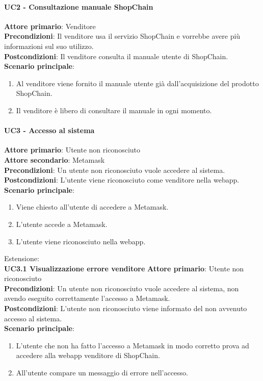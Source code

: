\documentclass[a4paper, 12pt]{article}
\begin{document}
\paragraph{UC2 - Consultazione manuale ShopChain}
\textbf{Attore primario}: Venditore\\
\textbf{Precondizioni}: Il venditore usa il servizio ShopChain e vorrebbe avere più informazioni sul suo utilizzo.\\
\textbf{Postcondizioni}: Il venditore consulta il manuale utente di ShopChain.\\
\textbf{Scenario principale}:\\
\begin{enumerate}
\item Al venditore viene fornito il manuale utente già dall'acquisizione del prodotto ShopChain.
\item Il venditore è libero di consultare il manuale in ogni momento.
\end{enumerate}


\paragraph{UC3 - Accesso al sistema}
\textbf{Attore primario}: Utente non riconosciuto\\
\textbf{Attore secondario}: Metamask\\
\textbf{Precondizioni}:  Un utente non riconosciuto vuole accedere al sistema.\\
\textbf{Postcondizioni}: L'utente viene riconosciuto come venditore nella webapp.\\
\textbf{Scenario principale}:
\begin{enumerate}
\item Viene chiesto all'utente di accedere a Metamask.
\item L'utente accede a Metamask.
\item L'utente viene riconosciuto nella webapp.
\end{enumerate}
Estensione:\\
\textbf{UC3.1 Visualizzazione errore venditore}
\textbf{Attore primario}: Utente non riconosciuto\\
\textbf{Precondizioni}: Un utente non riconosciuto vuole accedere al sistema, non avendo eseguito correttamente l'accesso a Metamask.\\
\textbf{Postcondizioni}: L'utente non riconosciuto viene informato del non avvenuto accesso al sistema.\\
\textbf{Scenario principale}:
\begin{enumerate}
\item L'utente che non ha fatto l'accesso a Metamask in modo corretto prova ad accedere alla webapp venditore di ShopChain.
\item All'utente compare un messaggio di errore nell'accesso.
\end{enumerate}
\end{document}
